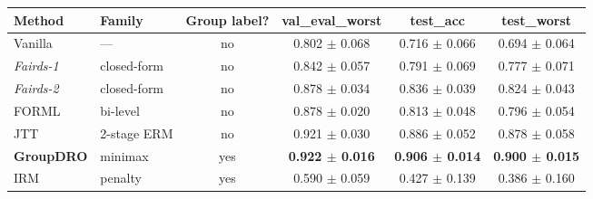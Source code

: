 \begin{tabular}{llcccc}
\toprule
Method & Family & Group label? & val\_eval\_worst & test\_acc & test\_worst \\
\midrule
Vanilla & — & no & 0.802 $\pm$ 0.068 & 0.716 $\pm$ 0.066 & 0.694 $\pm$ 0.064 \\
\textit{Fairds-1} & closed-form & no & 0.842 $\pm$ 0.057 & 0.791 $\pm$ 0.069 & 0.777 $\pm$ 0.071 \\
\textit{Fairds-2} & closed-form & no & 0.878 $\pm$ 0.034 & 0.836 $\pm$ 0.039 & 0.824 $\pm$ 0.043 \\
FORML & bi-level & no & 0.878 $\pm$ 0.020 & 0.813 $\pm$ 0.048 & 0.796 $\pm$ 0.054 \\
JTT & 2-stage ERM & no & 0.921 $\pm$ 0.030 & 0.886 $\pm$ 0.052 & 0.878 $\pm$ 0.058 \\
\textbf{GroupDRO} & minimax & yes & \textbf{0.922 $\pm$ 0.016} & \textbf{0.906 $\pm$ 0.014} & \textbf{0.900 $\pm$ 0.015} \\
IRM & penalty & yes & 0.590 $\pm$ 0.059 & 0.427 $\pm$ 0.139 & 0.386 $\pm$ 0.160 \\
\bottomrule
\end{tabular}